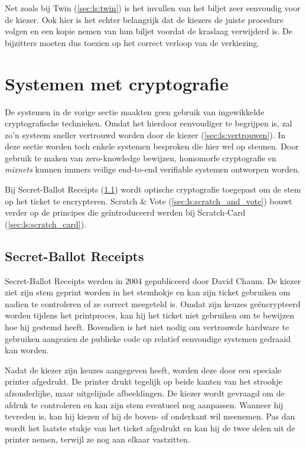 \npar Net zoals bij Twin (\ref{sec:ls:twin}) is het invullen van het biljet zeer eenvoudig voor de kiezer. Ook hier is het echter belangrijk dat de kiezers de juiste procedure volgen en een kopie nemen van hun biljet voordat de kraslaag verwijderd is. De bijzitters moeten dus toezien op het correct verloop van de verkiezing.

\section{Systemen met cryptografie}
\label{sec:ls:systemen_met_cryptografie}

De systemen in de vorige sectie maakten geen gebruik van ingewikkelde cryptografische technieken. Omdat het hierdoor eenvoudiger te begrijpen is, zal zo'n systeem sneller vertrouwd worden door de kiezer (\ref{sec:ls:vertrouwen}). In deze sectie worden toch enkele systemen besproken die hier wel op steunen. Door gebruik te maken van zero-knowledge bewijzen, homomorfe cryptografie en \textit{mixnets} kunnen immers veilige end-to-end verifiable systemen ontworpen worden.

\npar Bij Secret-Ballot Receipts (\ref{sec:ls:secret_ballot_receipts}) wordt optische cryptografie toegepast om de stem op het ticket te encrypteren. Scratch \& Vote (\ref{sec:ls:scratch_and_vote}) bouwt verder op de principes die geïntroduceerd werden bij Scratch-Card (\ref{sec:ls:scratch_card}).

\subsection[Secret-Ballot Receipts]{Secret-Ballot Receipts~\cite{chaum_secret_ballot}}
\label{sec:ls:secret_ballot_receipts}

Secret-Ballot Receipts werden in 2004 gepubliceerd door David Chaum. De kiezer ziet zijn stem geprint worden in het stemhokje en kan zijn ticket gebruiken om nadien te controleren of ze correct meegeteld is. Omdat zijn keuzes ge\"encrypteerd worden tijdens het printproces, kan hij het ticket niet gebruiken om te bewijzen hoe hij gestemd heeft. Bovendien is het niet nodig om vertrouwde hardware te gebruiken aangezien de publieke code op relatief eenvoudige systemen gedraaid kan worden.

\npar Nadat de kiezer zijn keuzes aangegeven heeft, worden deze door een speciale printer afgedrukt. De printer drukt tegelijk op beide kanten van het strookje afzonderlijke, maar uitgelijnde afbeeldingen. De kiezer wordt gevraagd om de afdruk te controleren en kan zijn stem eventueel nog aanpassen. Wanneer hij tevreden is, kan hij kiezen of hij de boven- of onderkant wil meenemen. Pas dan wordt het laatste stukje van het ticket afgedrukt en kan hij de twee delen uit de printer nemen, terwijl ze nog aan elkaar vastzitten.

